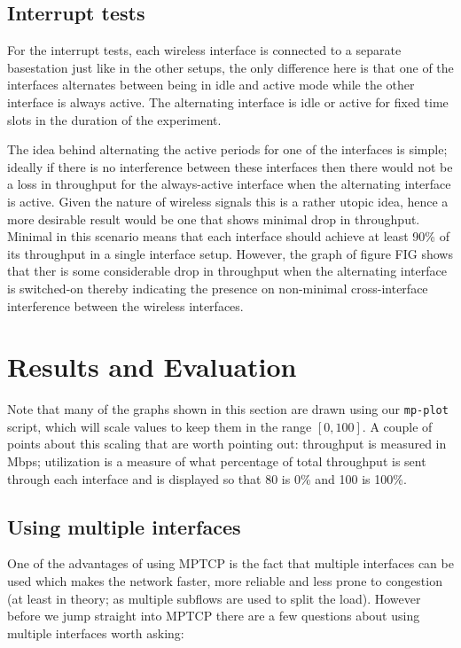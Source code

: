 \documentclass[12pt,a4paper]{article}
\begin{document}
\subsection{Interrupt tests}
For the interrupt tests, each wireless interface is connected to a separate
basestation just like in the other setups, the only difference here is that one
of the interfaces alternates between being in idle and active mode while the
other interface is always active. The alternating interface is idle or active
for fixed time slots in the duration of the experiment.

The idea behind alternating the active periods for one of the interfaces is
simple; ideally if there is no interference between these interfaces then there
would not be a loss in throughput for the always-active interface when the
alternating interface is active. Given the nature of wireless signals this is a
rather utopic idea, hence a more desirable result would be one that shows
minimal drop in throughput. Minimal in this scenario means that each interface
should achieve at least 90\% of its throughput in a single interface setup.
However, the graph of figure FIG shows that ther is some considerable drop in  %
throughput when the alternating interface is switched-on thereby indicating the
presence on non-minimal cross-interface interference between the wireless
interfaces.

\section{Results and Evaluation}
Note that many of the graphs shown in this section are drawn using our
\texttt{mp-plot} script, which will scale values to keep them in the range
$[0,100]$. A couple of points about this scaling that are worth pointing out:
throughput is measured in Mbps; utilization is a measure of what percentage of
total throughput is sent through each interface and is displayed so that 80 is
0\% and 100 is 100\%.

\subsection{Using multiple interfaces}
One of the advantages of using MPTCP is the fact that multiple interfaces can be
used which makes the network faster, more reliable and less prone to congestion
(at least in theory; as multiple subflows are used to split the load). However
before we jump straight into MPTCP there are a few questions about using
multiple interfaces worth asking:
\end{document}
